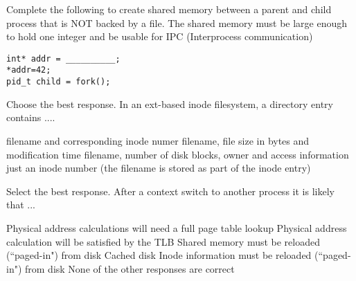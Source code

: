 \variant
Complete the following to create shared memory between a parent and child process that is NOT backed by a file. The shared memory must be large enough to hold one integer and be usable for IPC (Interprocess communication)
\begin{verbatim}
int* addr = __________;
*addr=42;
pid_t child = fork();
\end{verbatim}
\begin{answers}
\end{answers}
\begin{solution}
\end{solution}

\variant
Choose the best response. In an ext-based inode filesystem, a directory entry contains .... 
\begin{answers}
\correctanswer filename and corresponding inode numer
\answer filename, file size in bytes and modification time
\answer filename, number of disk blocks, owner and access information
\answer just an inode number (the filename is stored as part of the inode entry)
\end{answers}
\begin{solution}
\end{solution}

\variant
Select the best response. After a context switch to another process it is likely that ...
\begin{answers}
\correctanswer Physical address calculations will need a full page table lookup
\answer Physical address calculation will be satisfied by the TLB
\answer Shared memory must be reloaded (``paged-in") from disk
\answer Cached disk Inode information must be reloaded (``paged-in") from disk
\answer None of the other responses are correct
\end{answers}
\begin{solution}
\end{solution}

